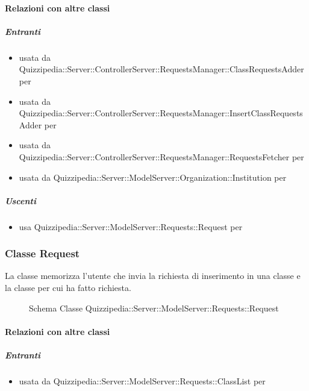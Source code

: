 \paragraph{Relazioni con altre classi}
\subparagraph{Entranti}
\begin{itemize}
\item usata da Quizzipedia::Server::ControllerServer::RequestsManager::ClassRequestsAdder per 
\item usata da Quizzipedia::Server::ControllerServer::RequestsManager::InsertClassRequestsAdder per 
\item usata da Quizzipedia::Server::ControllerServer::RequestsManager::RequestsFetcher per 
\item usata da Quizzipedia::Server::ModelServer::Organization::Institution per 
\end{itemize}
\subparagraph{Uscenti}
\begin{itemize}
\item usa Quizzipedia::Server::ModelServer::Requests::Request per 
\end{itemize}
\subsubsection{Classe Request}
La classe memorizza l'utente che invia la richiesta di inserimento in una classe e la classe per cui ha fatto richiesta.
\begin{figure}[H]
\centering
\noindent{}
\caption[Schema Classe Request]{Schema Classe Quizzipedia::Server::ModelServer::Requests::Request}
\end{figure}
\paragraph{Relazioni con altre classi}
\subparagraph{Entranti}
\begin{itemize}
\item usata da Quizzipedia::Server::ModelServer::Requests::ClassList per 
\end{itemize}
